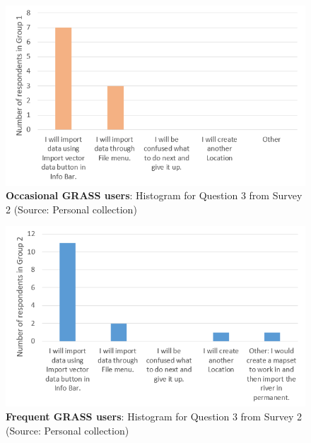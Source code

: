 \documentclass[a4paper,10pt,twoside]{article}
\begin{document}
\newpage
\vspace{0.3cm}
\begin{figure}[hbt!] 
\begin{center}
\includegraphics[width=14cm]{../surveys/analyzed_data/survey2_question3_histogram_group1.png}
\caption[\textbf{Occasional GRASS users}: Histogram for Question 3 from Survey 2]{\textbf{Occasional GRASS users}: Histogram for Question 3 from Survey 2 (Source: Personal collection)}
\label{fig:survey2_question3_histogram_group1}
\end{center}
\end{figure}

\vspace{0.3cm}
\begin{figure}[hbt!]
\begin{center}
\includegraphics[width=14cm]{../surveys/analyzed_data/survey2_question3_histogram_group2.png} 
\caption[\textbf{Frequent GRASS users}: Histogram for Question 3 from Survey 2]{\textbf{Frequent GRASS users}: Histogram for Question 3 from Survey 2 (Source: Personal collection)}
\label{fig:survey2_question3_histogram_group2}
\end{center}
\end{figure}
\end{document}
